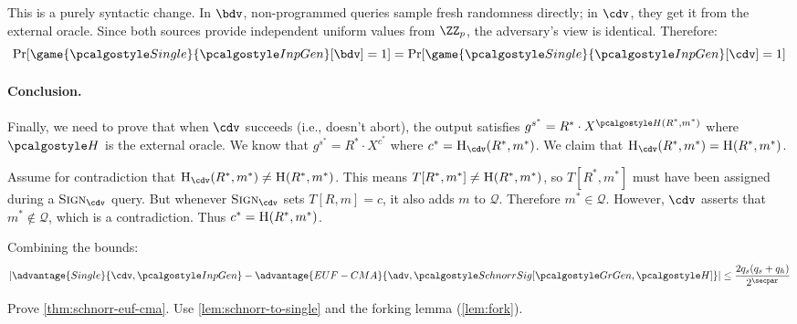 \begin{mysolution}
  This is a purely syntactic change. In $\bdv$, non-programmed queries sample fresh randomness directly; in $\cdv$, they get it from the external oracle.
  Since both sources provide independent uniform values from $\ZZ_p$, the adversary's view is identical. Therefore:
  \[
    \Pr[\game{\algo{Single}}{\algo{InpGen}}[\bdv] = 1] = \Pr[\game{\algo{Single}}{\algo{InpGen}}[\cdv] = 1]
  \]

  \paragraph{Conclusion.}
  Finally, we need to prove that when $\cdv$ succeeds (i.e., doesn't abort), the output satisfies $g^{s^*} = R^* \cdot X^{\algo{H}(R^*, m^*)}$ where $\algo{H}$ is the external oracle. We know that $g^{s^*} = R^* \cdot X^{c^*}$ where $c^* = \pcoracle{H}_{\cdv}(R^*, m^*)$. We claim that $\pcoracle{H}_{\cdv}(R^*, m^*) = \pcoracle{H}(R^*, m^*)$.
  
  Assume for contradiction that $\pcoracle{H}_{\cdv}(R^*, m^*) \neq \pcoracle{H}(R^*, m^*)$. This means $T[R^*, m^*] \neq {\normalfont\textsc{H}}(R^*, m^*)$, so $T[R^*, m^*]$ must have been assigned during a $\pcoracle{Sign}_{\cdv}$ query. But whenever $\pcoracle{Sign}_{\cdv}$ sets $T[R, m] = c$, it also adds $m$ to $\mathcal{Q}$. Therefore $m^* \in \mathcal{Q}$. However, $\cdv$ asserts that $m^* \notin \mathcal{Q}$, which is a contradiction. Thus $c^* = {\normalfont\textsc{H}}(R^*, m^*)$.
  
  Combining the bounds:
  \[
    \left|\advantage{Single}{\cdv, \algo{InpGen}} - \advantage{EUF-CMA}{\adv, \algo{SchnorrSig}[\grgen, \algo{H}]}\right| \leq \frac{2 q_s(q_s + q_h)}{2^\secpar}
  \]

\end{mysolution}
\fi

\begin{exercise}\label{ex:schnorr-euf-cma}
  Prove \autoref{thm:schnorr-euf-cma}. Use \autoref{lem:schnorr-to-single} and the forking lemma (\autoref{lem:fork}).
\end{exercise}

